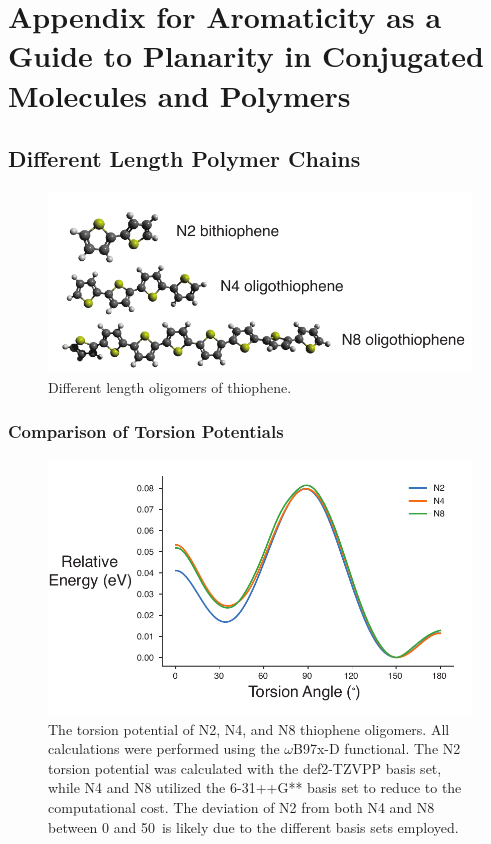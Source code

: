 \chapter{Appendix for Aromaticity as a Guide to Planarity in Conjugated Molecules and Polymers}

\section{Different Length Polymer Chains}\label{sec:aroma_diff_len_poly}
\begin{figure}[hbt!]
    \centering
    \includegraphics{figures/append_aroma/p_chains_graphic_copy.pdf}
    \caption{Different length oligomers of thiophene.}
    \label{fig:p_chains}
\end{figure}

\subsection{Comparison of Torsion Potentials}
\begin{figure}[hbt!]
    \centering
    \includegraphics{figures/append_aroma/p_tor_compare_copy.pdf}
    \caption{The torsion potential of N2, N4, and N8 thiophene oligomers. All calculations were performed using the $\omega$B97x-D functional. The N2 torsion potential was calculated with the def2-TZVPP basis set, while N4 and N8 utilized the 6-31++G**\cite{Hehre1972} basis set to reduce to the computational cost. The deviation of N2 from both N4 and N8 between 0 and 50\textdegree \ is likely due to the different basis sets employed.}
    \label{fig:p_tor_compare}
\end{figure}


